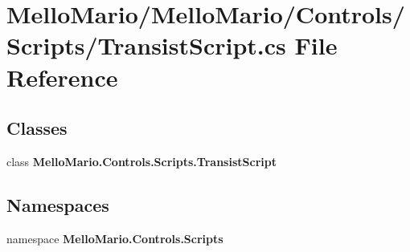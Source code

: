 \section{Mello\+Mario/\+Mello\+Mario/\+Controls/\+Scripts/\+Transist\+Script.cs File Reference}
\label{TransistScript_8cs}
\subsection*{Classes}
\begin{DoxyCompactItemize}
\item 
class \textbf{ Mello\+Mario.\+Controls.\+Scripts.\+Transist\+Script}
\end{DoxyCompactItemize}
\subsection*{Namespaces}
\begin{DoxyCompactItemize}
\item 
namespace \textbf{ Mello\+Mario.\+Controls.\+Scripts}
\end{DoxyCompactItemize}
